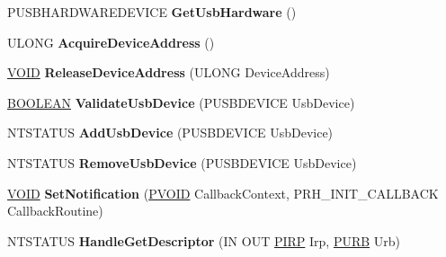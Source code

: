 \begin{DoxyCompactItemize}
\item 
\mbox{\label{class_c_hub_controller_a02307d19fbd2fa193373bd7ba7b8eaa4}} 
P\+U\+S\+B\+H\+A\+R\+D\+W\+A\+R\+E\+D\+E\+V\+I\+CE {\bfseries Get\+Usb\+Hardware} ()
\item 
\mbox{\label{class_c_hub_controller_aa538db9a39f3a8089cb5619e56a0e6c6}} 
U\+L\+O\+NG {\bfseries Acquire\+Device\+Address} ()
\item 
\mbox{\label{class_c_hub_controller_ad7dc737761dab07d4e0540cc43615ded}} 
\hyperlink{interfacevoid}{V\+O\+ID} {\bfseries Release\+Device\+Address} (U\+L\+O\+NG Device\+Address)
\item 
\mbox{\label{class_c_hub_controller_a09d2e5e50943644291cfeac0512bc086}} 
\hyperlink{_processor_bind_8h_a112e3146cb38b6ee95e64d85842e380a}{B\+O\+O\+L\+E\+AN} {\bfseries Validate\+Usb\+Device} (P\+U\+S\+B\+D\+E\+V\+I\+CE Usb\+Device)
\item 
\mbox{\label{class_c_hub_controller_aa8638115b0663a4b1ae7b3a833a537fe}} 
N\+T\+S\+T\+A\+T\+US {\bfseries Add\+Usb\+Device} (P\+U\+S\+B\+D\+E\+V\+I\+CE Usb\+Device)
\item 
\mbox{\label{class_c_hub_controller_adb156571aa17452e9ed0929fa94a4524}} 
N\+T\+S\+T\+A\+T\+US {\bfseries Remove\+Usb\+Device} (P\+U\+S\+B\+D\+E\+V\+I\+CE Usb\+Device)
\item 
\mbox{\label{class_c_hub_controller_a30b822856c0ee5e862218b9b58074bd0}} 
\hyperlink{interfacevoid}{V\+O\+ID} {\bfseries Set\+Notification} (\hyperlink{interfacevoid}{P\+V\+O\+ID} Callback\+Context, P\+R\+H\+\_\+\+I\+N\+I\+T\+\_\+\+C\+A\+L\+L\+B\+A\+CK Callback\+Routine)
\item 
\mbox{\label{class_c_hub_controller_aeb947ab0c6aebea2a3db48de4d78bfce}} 
N\+T\+S\+T\+A\+T\+US {\bfseries Handle\+Get\+Descriptor} (IN O\+UT \hyperlink{interfacevoid}{P\+I\+RP} Irp, \hyperlink{struct___u_r_b}{P\+U\+RB} Urb)
\item 
\mbox{\label{class_c_hub_controller_a9a4377a571f96906325d7c37eaa9bf43}} 

\end{DoxyCompactItemize}
